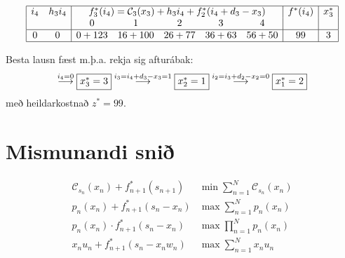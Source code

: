 \begin{lausnSYND}
\begin{description}
{\[\begin{array}{|cc|ccccc|c|c|}\hline
  i_4 & h_3i_4 & \multicolumn{5}{c|}{f_3^*(i_4)=\mathcal{C}_3(x_3)+h_3i_4+f_2^*(i_4+d_3-x_3)} & f^*(i_4) & x_3^* \\
 &  &0&1& 2 & 3 & 4 & &\\ \hline 
0 & 0 & 0+123&16+100&26+77&36+63&56+50&99&3\\
\hline \end{array}\]}
\end{description}
Besta lausn fæst m.þ.a. rekja sig afturábak:
$$\stackrel{i_4=0}{\longrightarrow}\fbox{$x_3^*=3$}\stackrel{i_3=i_4+d_3-x_3=1}{\longrightarrow}\fbox{$x_2^*=1$}\stackrel{i_2=i_3+d_2-x_2=0}{\longrightarrow}\fbox{$x_1^*=2$}$$ með heildarkostnað $z^*=99$.
\end{lausnSYND}


\section*{Mismunandi snið}
\[
\begin{array}{ll}
  \mathcal{C}_{s_n}(x_n)+f^*_{n+1}(s_{n+1}) & \min \sum_{n=1}^N \mathcal{C}_{s_n}(x_n) \\
  p_n(x_n)+f^*_{n+1}(s_n-x_n) & \max \sum_{n=1}^N p_n(x_n) \\
  p_n(x_n)\cdot f^*_{n+1}(s_n-x_n) & \max \prod_{n=1}^N p_n(x_n) \\
  x_nu_n+f^*_{n+1}(s_n-x_nw_n) & \max \sum_{n=1}^N x_nu_n \\
\end{array}
\]



